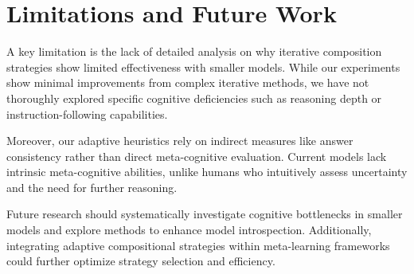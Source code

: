 \section{Limitations and Future Work}

A key limitation is the lack of detailed analysis on why iterative composition strategies show limited effectiveness with smaller models. While our experiments show minimal improvements from complex iterative methods, we have not thoroughly explored specific cognitive deficiencies such as reasoning depth or instruction-following capabilities.

Moreover, our adaptive heuristics rely on indirect measures like answer consistency rather than direct meta-cognitive evaluation. Current models lack intrinsic meta-cognitive abilities, unlike humans who intuitively assess uncertainty and the need for further reasoning.

Future research should systematically investigate cognitive bottlenecks in smaller models and explore methods to enhance model introspection. Additionally, integrating adaptive compositional strategies within meta-learning frameworks could further optimize strategy selection and efficiency.
